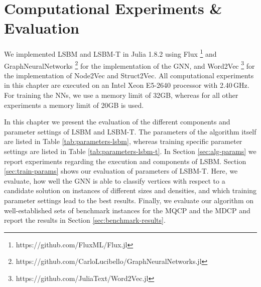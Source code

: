 \documentclass[draft,final]{vutinfth} %
\begin{document}

\chapter{Computational Experiments \& Evaluation}\label{chp:evaluation}

We implemented LSBM and LSBM-T in Julia 1.8.2 using Flux \footnote{https://github.com/FluxML/Flux.jl} and GraphNeuralNetworks \footnote{https://github.com/CarloLucibello/GraphNeuralNetworks.jl}\cite{Lucibello2021GNN} for the implementation of the GNN, and Word2Vec \footnote{https://github.com/JuliaText/Word2Vec.jl} for the implementation of Node2Vec and Struct2Vec. All computational experiments in this chapter are executed on an Intel Xeon E5-2640 processor with 2.40\,GHz. For training the NNs, we use a memory limit of 32GB, whereas for all other experiments a memory limit of 20GB is used. 

In this chapter we present the evaluation of the different components and parameter settings of LSBM and LSBM-T. The parameters of the algorithm itself are listed in Table \ref{tab:parameters-lsbm}, whereas training specific parameter settings are listed in Table \ref{tab:parameters-lsbm-t}. 
In Section \ref{sec:alg-params} we report experiments regarding the execution and components of LSBM. 
Section \ref{sec:train-params} shows our evaluation of parameters of LSBM-T. Here, we evaluate, how well the GNN is able to classify vertices with respect to a candidate solution on instances of different sizes and densities, and which training parameter settings lead to the best results. Finally, we evaluate our algorithm on well-established sets of benchmark instances for the MQCP and the MDCP and report the results in Section \ref{sec:benchmark-results}. 
\end{document}
